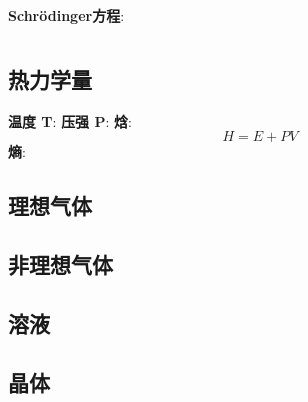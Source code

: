 \documentclass{article}
\begin{document}
\section{}
\subsection{}
\textbf{Schrödinger方程}:


\section{}

\subsection{热力学量}
\textbf{温度 T}:
\textbf{压强 P}:
\textbf{焓}:
$$H = E + P V$$
\textbf{熵}:


\subsection{理想气体}


\subsection{非理想气体}


\subsection{溶液}


\subsection{晶体}
\end{document}
